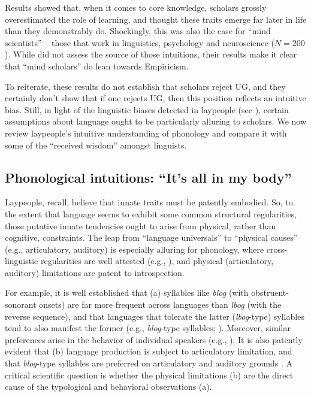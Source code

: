 \documentclass[output=paper,colorlinks,citecolor=brown
]{langscibook}
\begin{document}
Results showed that, when it comes to core knowledge, scholars grossly overestimated the role of learning, and thought these traits emerge far later in life than they demonstrably do. Shockingly, this was also the case for ``mind scientists'' -- those that work in linguistics, psychology and neuroscience ($N=200$). While \citet{wang2019empiricism} did not assess the source of those intuitions, their results make it clear that ``mind scholars'' do lean towards Empiricism.

To reiterate, these results do not establish that scholars reject UG, and they certainly don’t show that if one rejects UG, then this position reflects an intuitive bias. Still, in light of the linguistic biases detected in laypeople (see ), certain assumptions about language ought to be particularly alluring to scholars. We now review laypeople’s intuitive understanding of phonology and compare it with some of the ``received wisdom'' amongst linguists. 

\subsection{Phonological intuitions: ``It’s all in my body''}

Laypeople, recall, believe that innate traits must be patently embodied. So, to the extent that language seems to exhibit some common structural regularities, those putative innate tendencies ought to arise from physical, rather than cognitive, constraints. The leap from ``language universals'' to ``physical causes'' (e.g., articulatory, auditory) is especially alluring for phonology, where cross-linguistic regularities are well attested (e.g., \cite{greenberg1966universals}), and physical (articulatory, auditory) limitations are patent to introspection. 

For example, it is well established that (a) syllables like \textit{blog} (with obstruent-sonorant onsets) are far more frequent across languages than \textit{lbog} (with the reverse sequence), and that languages that tolerate the latter (\textit{lbog}-type) syllables tend to also manifest the former (e.g., \textit{blog}-type syllables; \cite{greenberg1978some}). Moreover, similar preferences arise in the behavior of individual speakers (e.g., \cite{berent2013phonologicalb}). It is also patently evident that (b) language production is subject to articulatory limitation, and that \textit{blog}-type syllables are preferred on articulatory and auditory grounds \citep{mattingly1981phonetic,wright2004review}. A critical scientific question is whether the physical limitations (b) are the direct cause of the typological and behavioral observations (a). 
\end{document}
